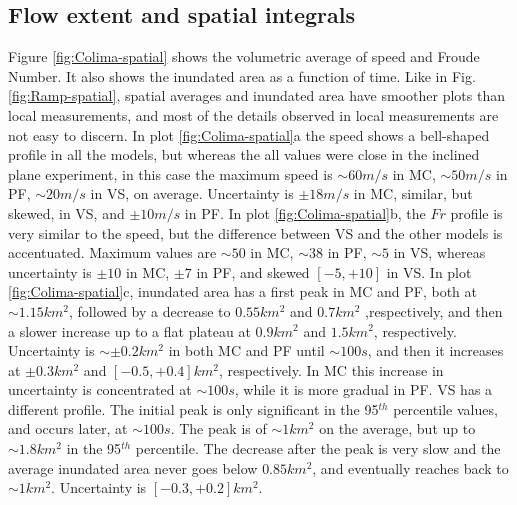 \documentclass{article}
\begin{document}
\subsection{Flow extent and spatial integrals}
Figure \ref{fig:Colima-spatial} shows the volumetric average of speed and Froude Number. It also shows the inundated area as a function of time. Like in Fig.\ref{fig:Ramp-spatial}, spatial averages and inundated area have smoother plots than local measurements, and most of the details observed in local measurements are not easy to discern. In plot \ref{fig:Colima-spatial}a the speed shows a bell-shaped profile in all the models, but whereas the all values were close in the inclined plane experiment, in this case the maximum speed is $\sim 60 m/s$ in MC, $\sim 50 m/s$ in PF, $\sim 20 m/s$ in VS, on average. Uncertainty is $\pm 18 m/s$ in MC, similar, but skewed, in VS, and $\pm 10 m/s$ in PF. In plot \ref{fig:Colima-spatial}b, the $Fr$ profile is very similar to the speed, but the difference between VS and the other models is accentuated. Maximum values are $\sim 50$ in MC, $\sim 38$ in PF, $\sim 5$ in VS, whereas uncertainty is $\pm 10$ in MC, $\pm 7$ in PF, and skewed $[-5, +10]$ in VS. In plot \ref{fig:Colima-spatial}c, inundated area has a first peak in MC and PF, both at $\sim 1.15 km^2$, followed by a decrease to $0.55 km^2$ and $0.7 km^2$ ,respectively, and then a slower increase up to a flat plateau at $0.9 km^2$ and $1.5 km^2$, respectively. Uncertainty is $\sim \pm 0.2 km^2$ in both MC and PF until $\sim 100 s$, and then it increases at $\pm 0.3 km^2$ and $[-0.5, +0.4] km^2$, respectively. In MC this increase in uncertainty is concentrated at $\sim 100 s$, while it is more gradual in PF. VS has a different profile. The initial peak is only significant in the 95$^{th}$ percentile values, and occurs later, at $\sim 100 s$. The peak is of $\sim 1 km^2$ on the average, but up to $\sim 1.8 km^2$ in the 95$^{th}$ percentile. The decrease after the peak is very slow and the average inundated area never goes below $0.85 km^2$, and eventually reaches back to $\sim 1 km^2$. Uncertainty is $[-0.3, +0.2] km^2$.
\end{document}
